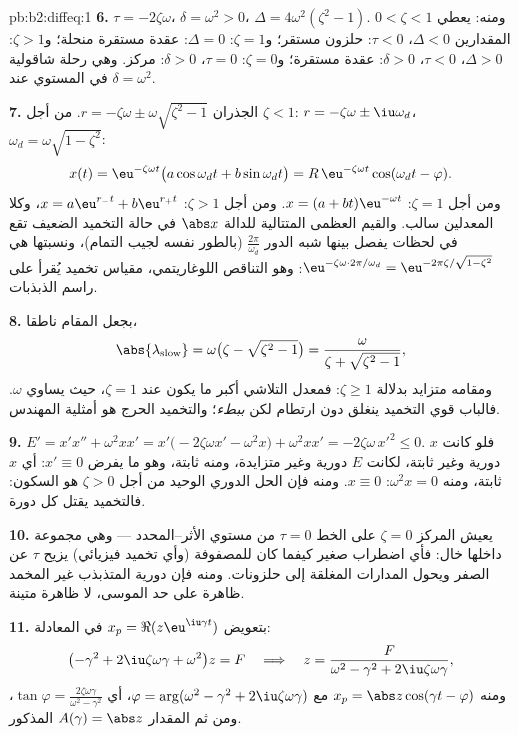 \begin{solution}{pb:b2:diffeq:1}
\textbf{6.} $\tau = -2\zeta\omega$، $\delta = \omega^2 > 0$، $\Delta = 4\omega^2(\zeta^2 - 1)$. ومنه: يعطي $0 < \zeta < 1$ المقدارين
$\Delta < 0$، $\tau < 0$: حلزون مستقر؛ و$\zeta = 1$: $\Delta =
0$: عقدة مستقرة منحلة؛
و$\zeta > 1$: $\Delta > 0$، $\tau <
0$، $\delta > 0$: عقدة مستقرة؛ و$\zeta = 0$: $\tau = 0$،
$\delta > 0$: مركز. وهي رحلة شاقولية في المستوي عند
$\delta = \omega^2$.

\textbf{7.} الجذران $r = -\zeta\omega \pm
\omega\sqrt{\zeta^2-1}$. من أجل $\zeta < 1$: $r = -\zeta\omega
\pm \iu\omega_d$، $\omega_d = \omega\sqrt{1-\zeta^2}$:
\[
x(t) = \eu^{-\zeta\omega t}\bigl(a\cos\omega_dt +
b\sin\omega_dt\bigr)
= R\,\eu^{-\zeta\omega t}\cos(\omega_dt - \varphi) .
\]
ومن أجل $\zeta = 1$: $x = (a + bt)\eu^{-\omega t}$. ومن أجل $\zeta >
1$: $x = a\eu^{r_-t} + b\eu^{r_+t}$، وكلا المعدلين
سالب. والقيم العظمى المتتالية للدالة $\abs x$ في حالة التخميد الضعيف
تقع في لحظات يفصل بينها شبه الدور $\frac{2\pi}{\omega_d}$ (بالطور نفسه لجيب التمام)،
ونسبتها هي $\eu^{-\zeta\omega\cdot2\pi/\omega_d} =
\eu^{-2\pi\zeta/\sqrt{1-\zeta^2}}$: وهو التناقص اللوغاريتمي، مقياس تخميد يُقرأ على
راسم الذبذبات.

\textbf{8.} بجعل المقام ناطقا،
\[
\abs{\lambda_{\mathrm{slow}}} = \omega\bigl(\zeta -
\sqrt{\zeta^2-1}\bigr)
= \frac{\omega}{\zeta + \sqrt{\zeta^2 - 1}} ,
\]
ومقامه متزايد بدلالة $\zeta \geq 1$: فمعدل التلاشي أكبر ما يكون عند $\zeta = 1$،
حيث يساوي $\omega$. فالباب قوي التخميد ينغلق دون ارتطام لكن
\emph{ببطء}؛ والتخميد الحرج هو أمثلية المهندس.

\textbf{9.} $E' = x'x'' + \omega^2xx' =
x'\bigl(-2\zeta\omega x' - \omega^2x\bigr) + \omega^2xx' =
-2\zeta\omega\,x'^2 \leq 0$. فلو كانت $x$ دورية وغير ثابتة، لكانت $E$
دورية وغير متزايدة، ومنه ثابتة، وهو ما يفرض $x' \equiv 0$: أي $x$ ثابتة،
ومنه $\omega^2x = 0$: $x \equiv 0$. ومنه فإن الحل الدوري الوحيد من أجل $\zeta > 0$ هو
السكون: فالتخميد يقتل كل دورة.

\textbf{10.} يعيش المركز $\zeta = 0$ على الخط $\tau =
0$ من مستوي
الأثر--المحدد --- وهي مجموعة داخلها خال: فأي اضطراب صغير كيفما كان
للمصفوفة (وأي تخميد فيزيائي) يزيح $\tau$ عن الصفر ويحول المدارات
المغلقة إلى حلزونات. ومنه فإن دورية المتذبذب غير المخمد ظاهرة على
حد الموسى، لا ظاهرة متينة.

\textbf{11.} بتعويض $x_p = \Re(z\eu^{\iu\gamma t})$ في المعادلة:
\[
\bigl(-\gamma^2 + 2\iu\zeta\omega\gamma +
\omega^2\bigr)z = F
\quad\Longrightarrow\quad
z = \frac{F}{\omega^2 - \gamma^2 + 2\iu\zeta\omega\gamma},
\]
ومنه $x_p = \abs z\cos(\gamma t - \varphi)$ مع $\varphi =
\arg(\omega^2 - \gamma^2 + 2\iu\zeta\omega\gamma)$، أي $\tan\varphi = \frac{2\zeta\omega\gamma}{\omega^2 -
\gamma^2}$، ومن ثم المقدار $A(\gamma) = \abs z$ المذكور.


\end{solution}
